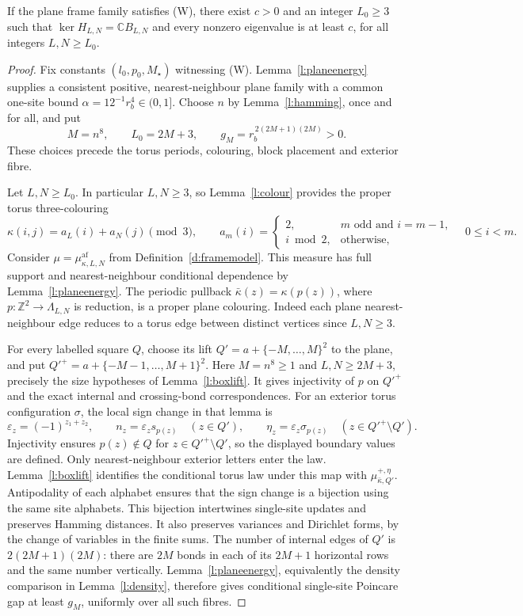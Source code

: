 \begin{theorem}\label{t:mainW}
If the plane frame family satisfies (W), there exist \(c>0\) and
an integer \(L_0\ge3\) such that
\(\ker H_{L,N}=\mathbb C B_{L,N}\) and every nonzero eigenvalue is
at least \(c\), for all integers \(L,N\ge L_0\).
\end{theorem}

\begin{proof}
Fix constants \((l_0,p_0,M_\star)\) witnessing (W).
Lemma~\ref{l:planeenergy} supplies a consistent positive,
nearest-neighbour plane family with a common one-site bound
\(\alpha=12^{-1}r_b^4\in(0,1]\).  Choose \(n\) by
Lemma~\ref{l:hamming}, once and for all, and put
\[
 M=n^8,\qquad L_0=2M+3,\qquad
 g_M=r_b^{\,2(2M+1)(2M)}>0.
\]
These choices precede the torus periods, colouring, block placement
and exterior fibre.

Let \(L,N\ge L_0\).  In particular \(L,N\ge3\), so
Lemma~\ref{l:colour} provides the proper torus three-colouring
\[
 \kappa(i,j)=a_L(i)+a_N(j)\pmod3,\qquad
 a_m(i)=\begin{cases}
 2,&m\text{ odd and }i=m-1,\\
 i\bmod2,&\text{otherwise},
 \end{cases}
 \quad 0\le i<m.
\]
Consider
\(\mu=\mu^{\mathrm{af}}_{\kappa,L,N}\) from
Definition~\ref{d:framemodel}.  This measure has full support and
nearest-neighbour conditional dependence by
Lemma~\ref{l:planeenergy}.  The periodic pullback
\(\bar\kappa(z)=\kappa(p(z))\), where
\(p:\mathbb Z^2\to\Lambda_{L,N}\) is reduction, is a proper plane
colouring.  Indeed each plane nearest-neighbour edge reduces to a
torus edge between distinct vertices since \(L,N\ge3\).

For every labelled square \(Q\), choose its lift
\(Q'=a+\{-M,\ldots,M\}^2\) to the plane, and put
\(Q'^+=a+\{-M-1,\ldots,M+1\}^2\).
Here \(M=n^8\ge1\) and \(L,N\ge2M+3\), precisely the size
hypotheses of Lemma~\ref{l:boxlift}.  It gives injectivity of
\(p\) on \(Q'^+\) and the exact internal and crossing-bond
correspondences.  For an exterior torus configuration \(\sigma\),
the local sign change in that lemma is
\[
 \varepsilon_z=(-1)^{z_1+z_2},\qquad
 n_z=\varepsilon_zs_{p(z)}\quad(z\in Q'),\qquad
 \eta_z=\varepsilon_z\sigma_{p(z)}
                                  \quad(z\in Q'^+\setminus Q').
\]
Injectivity ensures \(p(z)\notin Q\) for
\(z\in Q'^+\setminus Q'\), so the displayed boundary values
are defined.  Only nearest-neighbour exterior letters enter the law.
Lemma~\ref{l:boxlift} identifies the conditional torus law under
this map with \(\mu^{+,\eta}_{\bar\kappa,Q'}\).
Antipodality of each alphabet
ensures that the sign change is a bijection using the same site
alphabets.  This bijection intertwines single-site updates and
preserves Hamming distances.  It also preserves variances and
Dirichlet forms, by the change of variables in the finite sums.
The number of internal edges of \(Q'\) is
\(2(2M+1)(2M)\): there are \(2M\) bonds in each of its
\(2M+1\) horizontal rows and the same number vertically.
Lemma~\ref{l:planeenergy}, equivalently the density comparison in
Lemma~\ref{l:density}, therefore gives conditional single-site
Poincare gap at least \(g_M\), uniformly over all such fibres.


\end{proof}
